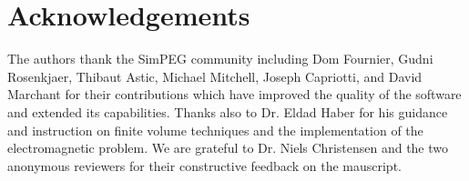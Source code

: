 \documentclass[paper]{geophysics}
\begin{document}
\section{Acknowledgements}
The authors thank the SimPEG community including Dom Fournier, Gudni Rosenkjaer, Thibaut Astic, Michael Mitchell, Joseph Capriotti, and David Marchant for their contributions which have improved the quality of the software and extended its capabilities. Thanks also to Dr. Eldad Haber for his guidance and instruction on finite volume techniques and the implementation of the electromagnetic problem. We are grateful to Dr. Niels Christensen and the two anonymous reviewers for their constructive feedback on the mauscript.
\clearpage

\end{document}
